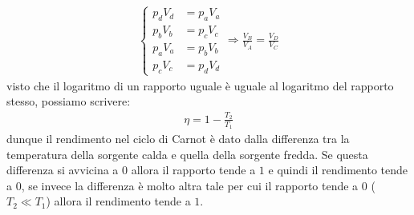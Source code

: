         \begin{align*}
            \left\{\begin{aligned}
                p_dV_d &= p_aV_a\\
                p_bV_b &= p_cV_c\\
                p_aV_a &= p_bV_b\\
                p_cV_c &= p_dV_d
            \end{aligned}\right.\Rightarrow \frac{V_B}{V_A} = \frac{V_D}{V_C}
        \end{align*}
        visto che il logaritmo di un rapporto uguale è uguale al logaritmo del rapporto stesso, possiamo scrivere:
        \begin{align*}
            \eta = 1 - \frac{T_2}{T_1}
        \end{align*}
        dunque il rendimento nel ciclo di Carnot è dato dalla differenza tra la temperatura della sorgente calda e quella della sorgente fredda. Se questa differenza si avvicina a $0$ allora il rapporto tende a $1$ e quindi il rendimento tende a $0$, se invece la differenza è molto altra tale per cui il rapporto tende a $0$ ($T_2 \ll T_1$) allora il rendimento tende a $1$. 

